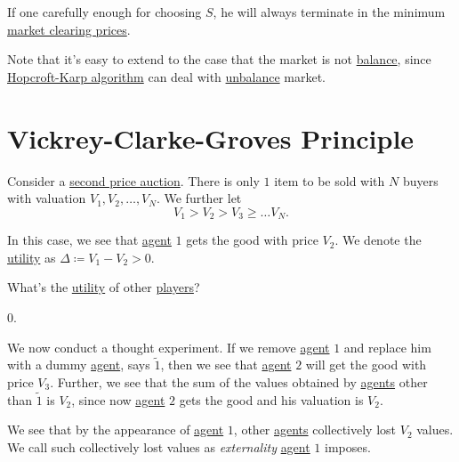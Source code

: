 If one carefully enough for choosing \(S\), he will always terminate in the minimum \hyperref[note:market-clearing-prices]{market clearing prices}.

\begin{note}
	Note that it's easy to extend to the case that the market is not \hyperref[def:balance]{balance}, since \hyperref[algo:Hopcroft-Karp-algorithm]{Hopcroft-Karp algorithm} can deal with \hyperref[def:balance]{unbalance} market.
\end{note}

\section{Vickrey-Clarke-Groves Principle}
Consider a \hyperref[eg:second-price-auction]{second price auction}. There is only \(1\) item to be sold with \(N\) buyers with valuation \(V_{1}, V_{2}, \ldots , V_{N}\). We further let
\[
	V_{1}>V_{2}>V_{3}\geq \ldots V_{N}.
\]

In this case, we see that \hyperref[def:player]{agent} \(1\) gets the good with price \(V_{2}\). We denote the \hyperref[def:reward]{utility} as \(\Delta\coloneqq V_{1}-V_{2}>0\).

\begin{problem}
What's the \hyperref[def:reward]{utility} of other \hyperref[def:player]{players}?
\end{problem}
\begin{answer}
	\(0\).
\end{answer}

We now conduct a thought experiment. If we remove \hyperref[def:player]{agent} \(1\) and replace him with a dummy \hyperref[def:player]{agent}, says \(\tilde{1}\), then we see that \hyperref[def:player]{agent} \(2\) will get the good with price \(V_{3}\). Further, we see that the sum of the values obtained by \hyperref[def:player]{agents} other than \(\tilde{1}\) is \(V_{2}\), since now \hyperref[def:player]{agent} \(2\) gets the good and his valuation is \(V_{2}\).

We see that by the appearance of \hyperref[def:player]{agent} \(1\), other \hyperref[def:player]{agents} collectively lost \(V_{2}\) values. We call such collectively lost values as \emph{externality} \hyperref[def:player]{agent} \(1\) imposes.

